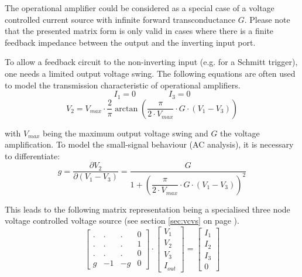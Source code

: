 The operational amplifier could be considered as a special case of a
voltage controlled current source with infinite forward
transconductance $G$.  Please note that the presented matrix form is
only valid in cases where there is a finite feedback impedance
between the output and the inverting input port.

\addvspace{12pt}

To allow a feedback circuit to the non-inverting input (e.g.  for a
Schmitt trigger), one needs a limited output voltage swing.  The
following equations are often used to model the transmission
characteristic of operational amplifiers.
\begin{equation}
I_1 = 0 \qquad\qquad I_3 = 0
\end{equation}
\begin{equation}
\label{eq:OPVout}
V_2 = V_{max}\cdot\dfrac{2}{\pi}\arctan \left( \dfrac{\pi}{2\cdot V_{max}}\cdot G\cdot (V_1-V_3) \right)
\end{equation}

with $V_{max}$ being the maximum output voltage swing and $G$ the
voltage amplification.  To model the small-signal behaviour (AC
analysis), it is necessary to differentiate:
\begin{equation}
g = \dfrac{\partial V_2}{\partial (V_1-V_3)}
  = \dfrac{G}{1+\left( \dfrac{\pi}{2\cdot V_{max}}\cdot G\cdot (V_1-V_3) \right)^2}
\end{equation}

This leads to the following matrix representation being a specialised
three node voltage controlled voltage source (see section
\ref{sec:vcvs} on page \pageref{sec:vcvs}).
\begin{equation}
\begin{bmatrix}
.&.&.& 0\\
.&.&.& 1\\
.&.&.& 0\\
g & -1 & -g & 0
\end{bmatrix}
\cdot
\begin{bmatrix}
V_{1}\\
V_{2}\\
V_{3}\\
I_{out}
\end{bmatrix}
=
\begin{bmatrix}
I_{1}\\
I_{2}\\
I_{3}\\
0
\end{bmatrix}
\end{equation}

